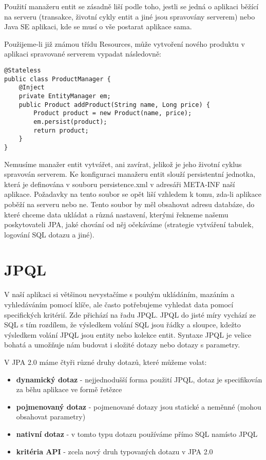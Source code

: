 \documentclass[122pt,oneside]{fithesis}
\begin{document}
Použití manažeru entit se zásadně liší podle toho, jestli se jedná o aplikaci běžící na serveru (transakce, životní cykly entit a jiné jsou spravovány serverem) nebo Java SE aplikaci, kde se musí o vše postarat aplikace sama.

Použijeme-li již známou třídu Resources, může vytvoření nového produktu v aplikaci spravované serverem vypadat následovně:

\begin{lstlisting}
@Stateless
public class ProductManager {
	@Inject
	private EntityManager em;
	public Product addProduct(String name, Long price) {
		Product product = new Product(name, price);
		em.persist(product);
		return product;
	}
}
\end{lstlisting}

Nemusíme manažer entit vytvářet, ani zavírat, jelikož je jeho životní cyklus spravován serverem. Ke konfiguraci manažeru entit slouží persistentní jednotka, která je definována v souboru persistence.xml v adresáři META-INF naší aplikace. Požadavky na tento soubor se opět liší vzhledem k tomu, zda-li aplikace poběží na serveru nebo ne. Tento soubor by měl obsahovat adresu databáze, do které chceme data ukládat a různá nastavení, kterými řekneme našemu poskytovateli JPA, jaké chování od něj očekáváme (strategie vytváření tabulek, logování SQL dotazu a jiné).

\section{JPQL}

V naší aplikaci si většinou nevystačíme s pouhým ukládáním, mazáním a vyhledáváním pomocí klíče, ale často potřebujeme vyhledat data pomocí specifických kritérií. Zde přichází na řadu JPQL. JPQL do jisté míry vychází ze SQL s tím rozdílem, že výsledkem volání SQL jsou řádky a sloupce, kdežto výsledkem volání JPQL jsou entity nebo kolekce entit. Syntaxe JPQL je velice bohatá a umožňuje nám budovat i složité dotazy nebo dotazy s parametry. 

V JPA 2.0 máme čtyři různé druhy dotazů, které můžeme volat:
\begin{itemize}
  \item {\bf dynamický dotaz} - nejjednodušší forma použití JPQL, dotaz je specifikován za běhu aplikace ve formě řetězce
  \item {\bf pojmenovaný dotaz} - pojmenované dotazy jsou statické a neměnné (mohou obsahovat parametry)
  \item {\bf nativní dotaz} - v tomto typu dotazu používáme přímo SQL namísto JPQL
  \item {\bf kritéria API} - zcela nový druh typovaných dotazu v JPA 2.0
\end{itemize}
\end{document}
